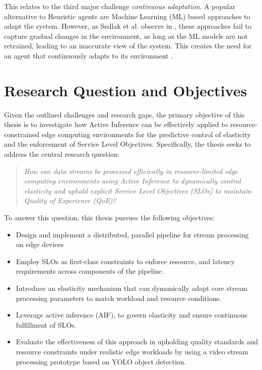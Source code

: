 This relates to the third major challenge \textit{continuous adaptation}\cite{danilenka_adaptive_2025}. A popular alternative to Heuristic agents are Machine Learning (ML) based approaches to adapt the system. However, as Sedlak et al. observe in \cite{sedlak_active_2024}, these approaches fail to capture gradual changes in the environment, as long as the ML models are not retrained, leading to an inaccurate view of the system. This creates the need for an agent that continuously adapts to its environment \cite{sedlak_equilibrium_2024}.

\section{Research Question and Objectives}
\label{sec:research-question}
Given the outlined challenges and research gaps, the primary objective of this thesis is to
investigate how Active Inference can be effectively applied to resource-constrained edge
computing environments for the predictive control of elasticity and the enforcement of
Service Level Objectives. Specifically, the thesis seeks to address the central research question:

\begin{quote}
\textit{
How can data streams be processed efficiently in resource-limited edge computing environments using Active Inference to dynamically control elasticity and uphold explicit Service Level Objectives (SLOs) to maintain Quality of Experience (QoE)?
}
\end{quote}

To answer this question, this thesis pursues the following objectives:
\begin{itemize}
    \item Design and implement a distributed, parallel pipeline for stream processing on edge
devices
    \item Employ SLOs as first-class constraints to enforce resource, and latency
requirements across components of the pipeline.
    \item  Introduce an elasticity mechanism that can dynamically adapt core stream
processing parameters to match workload and resource conditions.
    \item Leverage active inference (AIF), to govern elasticity and ensure continuous fulfillment of SLOs.
    \item Evaluate the effectiveness of this approach in upholding quality standards
and resource constraints under realistic edge workloads by using a video stream processing prototype based on YOLO object detection.
\end{itemize}

